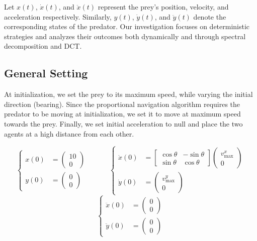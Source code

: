 \documentclass[11pt]{article}
\begin{document}
Let $x(t)$, $\dot{x}(t)$, and $\ddot{x}(t)$ represent the prey’s position, velocity, and acceleration respectively. Similarly, $y(t)$, $\dot{y}(t)$, and $\ddot{y}(t)$ denote the corresponding states of the predator. Our investigation focuses on deterministic strategies and analyzes their outcomes both dynamically and through spectral decomposition and DCT.

\subsection{General Setting}
At initialization, we set the prey to its maximum speed, while varying the initial direction (bearing). Since the proportional navigation algorithm requires the predator to be moving at initialization, we set it to move at maximum speed towards the prey. Finally, we set initial acceleration to null and place the two agents at a high distance from each other.

\[
\left\{
\begin{aligned}
    x(0) &= \begin{pmatrix} 10 \\ 0 \end{pmatrix} \\
    y(0) &= \begin{pmatrix} 0 \\ 0 \end{pmatrix}
\end{aligned}
\right.
\hspace{3em}
\left\{
\begin{aligned}
    \dot{x}(0) &= 
    \begin{bmatrix}
        \cos\theta & -\sin\theta \\
        \sin\theta & \cos\theta
    \end{bmatrix}
    \begin{pmatrix}
        v^x_{\text{max}} \\
        0
    \end{pmatrix} \\
    \dot{y}(0) &= \begin{pmatrix} v^y_{\text{max}} \\ 0 \end{pmatrix}
\end{aligned}
\right.
\]
\[
\left\{
\begin{aligned}
    \ddot{x}(0) &= \begin{pmatrix} 0 \\ 0 \end{pmatrix} \\
    \ddot{y}(0) &= \begin{pmatrix} 0 \\ 0 \end{pmatrix}
\end{aligned}
\right.
\]
\end{document}
